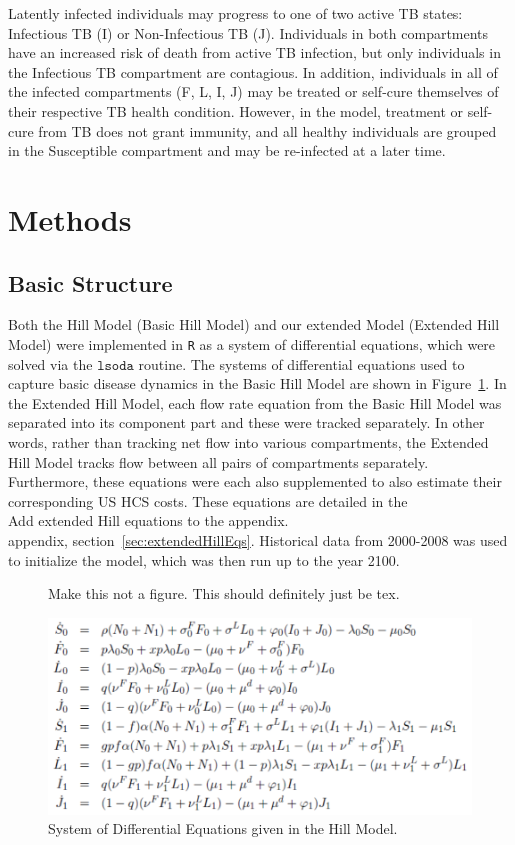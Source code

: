 \documentclass{amsart}
\begin{document}
Latently infected individuals may progress to one of two active TB states: Infectious TB (I) or 
Non-Infectious TB (J).  Individuals in both compartments have an increased risk of death from
active TB infection, but only individuals in the Infectious TB compartment are contagious.  
In addition, individuals in all of the infected compartments (F, L, I, J) may be treated or self-cure
themselves of their respective TB health condition.  However, in the model, treatment or self-cure from TB
does not grant immunity, and all healthy individuals are grouped in the Susceptible compartment
and may be re-infected at a later time.\\

\section{Methods}
\subsection{Basic Structure}
Both the Hill Model (Basic Hill Model) and our extended Model (Extended Hill
Model) were implemented in \texttt{R} as a system of differential equations,
which were solved via the $\texttt{lsoda}$ routine. The systems of differential
equations used to capture basic disease dynamics in the Basic Hill Model are
shown in Figure~\ref{fig:hillEquations}.  In the Extended Hill Model, each flow
rate equation from the Basic Hill Model was separated into its component part
and these were tracked separately. In other words, rather than tracking net flow
into various compartments, the Extended Hill Model tracks flow between all pairs
of compartments separately. Furthermore, these equations were each also supplemented to
also estimate their corresponding US HCS costs.  These equations are detailed in
the\\
{\huge\color{red} Add extended Hill equations to the appendix.}\\
appendix,
section~\ref{sec:extendedHillEqs}.  Historical data from 2000-2008 was used to
initialize the model, which was then run up to the year 2100.  

\begin{figure} 
  {\huge\color{red} Make this not a figure. This should definitely just be tex.}
  \begin{center}
    \includegraphics[scale=0.75]{figures/BasicHillEquations.pdf}
  \end{center}
  \caption{System of Differential Equations given in the Hill Model.}
  \label{fig:hillEquations}
\end{figure}
\end{document}
